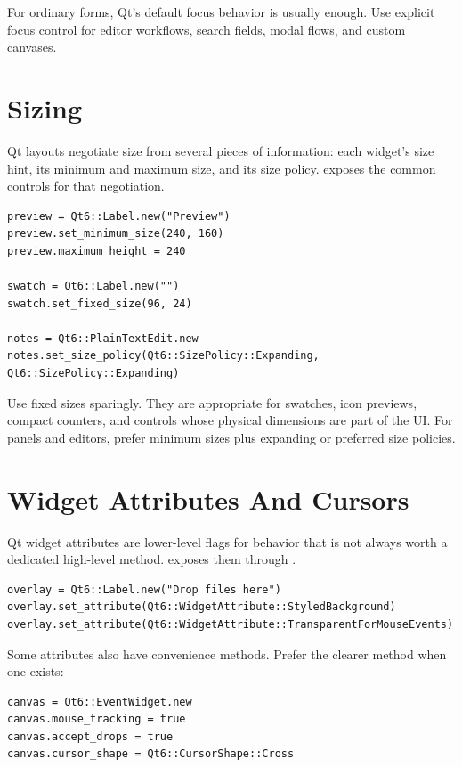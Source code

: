 For ordinary forms, Qt's default focus behavior is usually enough. Use explicit focus control for editor workflows, search fields, modal flows, and custom canvases.

\section{Sizing}

Qt layouts negotiate size from several pieces of information: each widget's size hint, its minimum and maximum size, and its size policy.  exposes the common controls for that negotiation.

\begin{lstlisting}[style=crystal]
preview = Qt6::Label.new("Preview")
preview.set_minimum_size(240, 160)
preview.maximum_height = 240

swatch = Qt6::Label.new("")
swatch.set_fixed_size(96, 24)

notes = Qt6::PlainTextEdit.new
notes.set_size_policy(Qt6::SizePolicy::Expanding, Qt6::SizePolicy::Expanding)
\end{lstlisting}

Use fixed sizes sparingly. They are appropriate for swatches, icon previews, compact counters, and controls whose physical dimensions are part of the UI. For panels and editors, prefer minimum sizes plus expanding or preferred size policies.

\section{Widget Attributes And Cursors}

Qt widget attributes are lower-level flags for behavior that is not always worth a dedicated high-level method.  exposes them through .

\begin{lstlisting}[style=crystal]
overlay = Qt6::Label.new("Drop files here")
overlay.set_attribute(Qt6::WidgetAttribute::StyledBackground)
overlay.set_attribute(Qt6::WidgetAttribute::TransparentForMouseEvents)
\end{lstlisting}

Some attributes also have convenience methods. Prefer the clearer method when one exists:

\begin{lstlisting}[style=crystal]
canvas = Qt6::EventWidget.new
canvas.mouse_tracking = true
canvas.accept_drops = true
canvas.cursor_shape = Qt6::CursorShape::Cross
\end{lstlisting}

